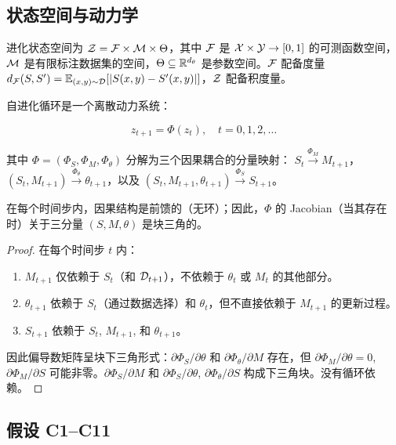 \subsection{状态空间与动力学}

进化状态空间为 $\mathcal{Z} = \mathcal{F} \times \mathcal{M} \times \Theta$，其中 $\mathcal{F}$ 是 $\mathcal{X} \times \mathcal{Y} \to [0,1]$ 的可测函数空间，$\mathcal{M}$ 是有限标注数据集的空间，$\Theta \subseteq \mathbb{R}^{d_\theta}$ 是参数空间。$\mathcal{F}$ 配备度量 $d_{\mathcal{F}}(S, S') = \mathbb{E}_{(x,y) \sim \mathcal{D}}[|S(x,y) - S'(x,y)|]$，$\mathcal{Z}$ 配备积度量。

自进化循环是一个离散动力系统：

\begin{equation}\label{eq:dynamics}
    z_{t+1} = \Phi(z_t), \quad t = 0, 1, 2, \dots
\end{equation}

其中 $\Phi = (\Phi_S, \Phi_M, \Phi_\theta)$ 分解为三个因果耦合的分量映射：
$S_t \xrightarrow{\Phi_M} M_{t+1}$，$(S_t, M_{t+1}) \xrightarrow{\Phi_\theta} \theta_{t+1}$，以及 $(S_t, M_{t+1}, \theta_{t+1}) \xrightarrow{\Phi_S} S_{t+1}$。

\begin{proposition}\label{prop:causal}
在每个时间步内，因果结构是前馈的（无环）；因此，$\Phi$ 的 Jacobian（当其存在时）关于三分量 $(S, M, \theta)$ 是块三角的。
\end{proposition}

\begin{proof}
在每个时间步 $t$ 内：
\begin{enumerate}[nosep]
    \item $M_{t+1}$ 仅依赖于 $S_t$（和 $\mathcal{D}_{t+1}$），不依赖于 $\theta_t$ 或 $M_t$ 的其他部分。
    \item $\theta_{t+1}$ 依赖于 $S_t$（通过数据选择）和 $\theta_t$，但不直接依赖于 $M_{t+1}$ 的更新过程。
    \item $S_{t+1}$ 依赖于 $S_t$, $M_{t+1}$, 和 $\theta_{t+1}$。
\end{enumerate}
因此偏导数矩阵呈块下三角形式：$\partial \Phi_S / \partial \theta$ 和 $\partial \Phi_\theta / \partial M$ 存在，但 $\partial \Phi_M / \partial \theta = 0$, $\partial \Phi_M / \partial S$ 可能非零。$\partial \Phi_S / \partial M$ 和 $\partial \Phi_S / \partial \theta$, $\partial \Phi_\theta / \partial S$ 构成下三角块。没有循环依赖。
\end{proof}

\subsection{假设 C1--C11}

